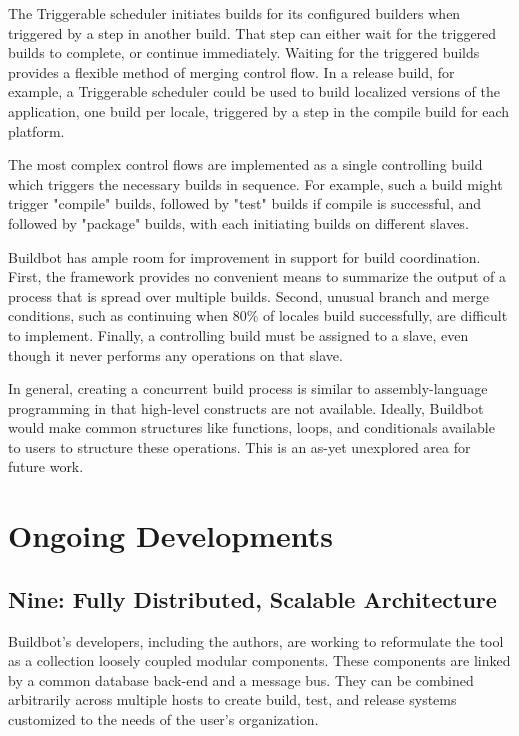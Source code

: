 \documentclass[conference]{IEEEtran}
\begin{document}
The Triggerable scheduler initiates builds for its configured builders when triggered by a step in another build.
That step can either wait for the triggered builds to complete, or continue immediately.
Waiting for the triggered builds provides a flexible method of merging control flow.
In a release build, for example, a Triggerable scheduler could be used to build localized versions of the application, one build per locale, triggered by a step in the compile build for each platform.

The most complex control flows are implemented as a single controlling build which triggers the necessary builds in sequence.
For example, such a build might trigger "compile" builds, followed by "test" builds if compile is successful, and followed by "package" builds, with each initiating builds on different slaves.

Buildbot has ample room for improvement in support for build coordination.
First, the framework provides no convenient means to summarize the output of a process that is spread over multiple builds.
Second, unusual branch and merge conditions, such as continuing when 80\% of locales build successfully, are difficult to implement.
Finally, a controlling build must be assigned to a slave, even though it never performs any operations on that slave.

In general, creating a concurrent build process is similar to assembly-language programming in that high-level constructs are not available.
Ideally, Buildbot would make common structures like functions, loops, and conditionals available to users to structure these operations.
This is an as-yet unexplored area for future work.

\section{Ongoing Developments}
\label{sec:ongoing-developments}

\subsection{Nine: Fully Distributed, Scalable Architecture}

Buildbot's developers, including the authors, are working to reformulate the tool as a collection loosely coupled modular components.
These components are linked by a common database back-end and a message bus.
They can be combined arbitrarily across multiple hosts to create build, test, and release systems customized to the needs of the user's organization.
\end{document}
